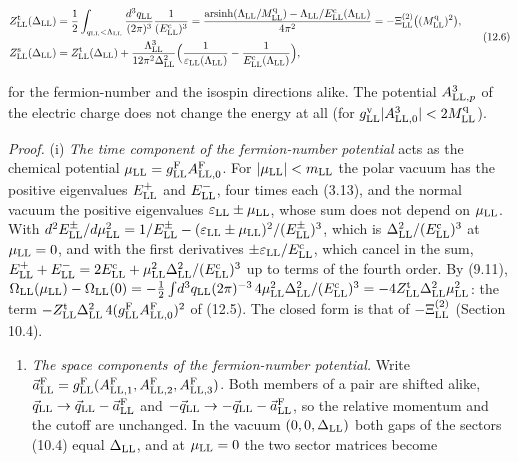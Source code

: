 \documentclass[
  10pt,
]{article}
\providecommand{\tightlist}{%
  \setlength{\itemsep}{0pt}\setlength{\parskip}{0pt}}
\begin{document}
\[\begin{aligned}Z^{\rm t}_{\rm LL}(\Delta_{\rm LL})&=\frac12\int_{q_{\rm LL}<\Lambda_{\rm LL}}\frac{d^3q_{\rm LL}}{(2\pi)^3}\frac1{(E^{\rm c}_{\rm LL})^3}=\frac{\mathrm{arsinh}(\Lambda_{\rm LL}/M^{\rm q}_{\rm LL})-\Lambda_{\rm LL}/E^{\rm c}_{\rm LL}(\Lambda_{\rm LL})}{4\pi^2}=-\Xi^{(2)}_{\rm LL}\big((M^{\rm q}_{\rm LL})^2\big),\\Z^{\rm s}_{\rm LL}(\Delta_{\rm LL})&=Z^{\rm t}_{\rm LL}(\Delta_{\rm LL})+\frac{\Lambda_{\rm LL}^3}{12\pi^2\Delta_{\rm LL}^2}\Big(\frac1{\varepsilon_{\rm LL}(\Lambda_{\rm LL})}-\frac1{E^{\rm c}_{\rm LL}(\Lambda_{\rm LL})}\Big),\end{aligned}\tag{12.6}\]

for the fermion-number and the isospin directions alike. The potential
\(A^3_{{\rm LL},p}\) of the electric charge does not change the energy
at all (for
\(g^{\rm v}_{\rm LL}\lvert A^3_{{\rm LL},0}\rvert<2M^{\rm q}_{\rm LL}\)).

\emph{Proof.} (i) \emph{The time component of the fermion-number
potential} acts as the chemical potential
\(\mu_{\rm LL}=g^{\rm F}_{\rm LL}A^{\rm F}_{{\rm LL},0}\). For
\(\lvert\mu_{\rm LL}\rvert<m_{\rm LL}\) the polar vacuum has the
positive eigenvalues \(E^+_{\rm LL}\) and \(E^-_{\rm LL}\), four times
each (3.13), and the normal vacuum the positive eigenvalues
\(\varepsilon_{\rm LL}\pm\mu_{\rm LL}\), whose sum does not depend on
\(\mu_{\rm LL}\). With
\(d^2E^\pm_{\rm LL}/d\mu_{\rm LL}^2=1/E^\pm_{\rm LL}-(\varepsilon_{\rm LL}\pm\mu_{\rm LL})^2/(E^\pm_{\rm LL})^3\),
which is \(\Delta_{\rm LL}^2/(E^{\rm c}_{\rm LL})^3\) at
\(\mu_{\rm LL}=0\), and with the first derivatives
\(\pm\varepsilon_{\rm LL}/E^{\rm c}_{\rm LL}\), which cancel in the sum,
\(E^+_{\rm LL}+E^-_{\rm LL}=2E^{\rm c}_{\rm LL}+\mu_{\rm LL}^2\Delta_{\rm LL}^2/(E^{\rm c}_{\rm LL})^3\)
up to terms of the fourth order. By (9.11),
\(\Omega_{\rm LL}(\mu_{\rm LL})-\Omega_{\rm LL}(0)=-\tfrac12\int\!d^3q_{\rm LL}(2\pi)^{-3}\,4\mu_{\rm LL}^2\Delta_{\rm LL}^2/(E^{\rm c}_{\rm LL})^3=-4Z^{\rm t}_{\rm LL}\Delta_{\rm LL}^2\mu_{\rm LL}^2\):
the term
\(-Z^{\rm t}_{\rm LL}\Delta_{\rm LL}^2\,4(g^{\rm F}_{\rm LL}A^{\rm F}_{{\rm LL},0})^2\)
of (12.5). The closed form is that of \(-\Xi^{(2)}_{\rm LL}\) (Section
10.4).

\begin{enumerate}
\def\labelenumi{(\roman{enumi})}
\setcounter{enumi}{1}
\tightlist
\item
  \emph{The space components of the fermion-number potential.} Write
  \(\vec a^{\rm F}_{\rm LL}=g^{\rm F}_{\rm LL}(A^{\rm F}_{{\rm LL},1},A^{\rm F}_{{\rm LL},2},A^{\rm F}_{{\rm LL},3})\).
  Both members of a pair are shifted alike,
  \(\vec q_{\rm LL}\to\vec q_{\rm LL}-\vec a^{\rm F}_{\rm LL}\) and
  \(-\vec q_{\rm LL}\to-\vec q_{\rm LL}-\vec a^{\rm F}_{\rm LL}\), so
  the relative momentum and the cutoff are unchanged. In the vacuum
  \((0,0,\Delta_{\rm LL})\) both gaps of the sectors (10.4) equal
  \(\Delta_{\rm LL}\), and at \(\mu_{\rm LL}=0\) the two sector matrices
  become
\end{enumerate}
\end{document}
